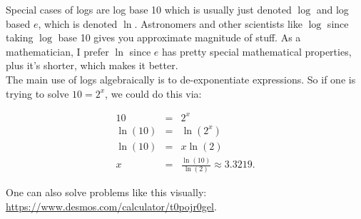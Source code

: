 Special cases of logs are log base 10 which is usually just denoted $\log$ and log based $e$, which is denoted $\ln$.  Astronomers and other scientists like $\log$ since taking $\log$ base 10 gives you approximate magnitude of stuff.  As a mathematician, I prefer $\ln$ since $e$ has pretty special mathematical properties, plus it's shorter, which makes it better.\\

The main use of logs algebraically is to de-exponentiate expressions.  So if one is trying to solve $10=2^x$, we could do this via:

\begin{eqnarray*}
10&=&2^x\\
\ln(10)&=&\ln(2^x)\\
\ln(10)&=&x\ln(2)\\
x&=&\frac{\ln(10)}{\ln(2)}\approx 3.3219.
\end{eqnarray*}

One can also solve problems like this visually:  \url{https://www.desmos.com/calculator/t0pojr0gel}.












